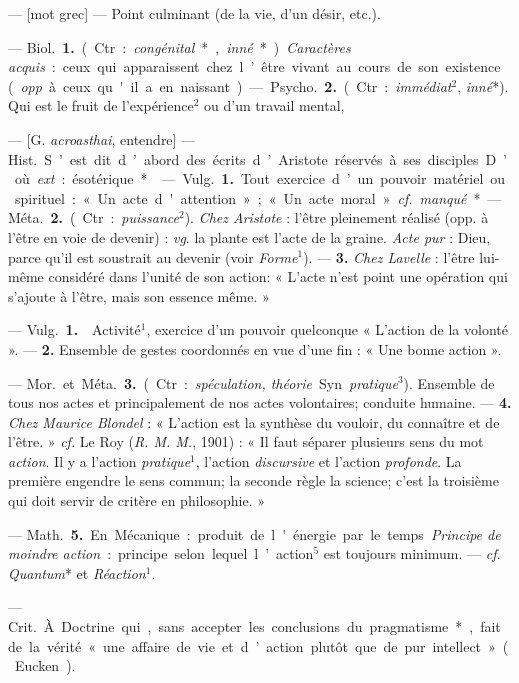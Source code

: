 \begin{itemize}[leftmargin=1cm, label=, itemsep=1pt]
 — [mot grec] — Point culminant
(de la vie, d’un désir, etc.).

 — \si{Biol.} {\bf 1.} (Ctr. : {\it congénital}*,
{\it inné}*). {\it Caractères acquis} : ceux qui
apparaissent chez l’être vivant au
cours de son existence ({\it opp}. à ceux
qu'il a en naissant).

— \si{Psycho.} {\bf 2.} (Ctr. : {\it immédiat}$^2$,
{\it inné}*). Qui est le fruit de l’expérience$^2$ ou d’un travail mental,

 — [G. {\it acroasthai}, entendre] — \si{Hist.} S’est dit d’abord des
écrits d’Aristote réservés à ses disciples. D’où {\it ext}. : ésotérique*.

 — \si{Vulg.} {\bf 1.} Tout exercice d’un
pouvoir matériel ou spirituel : « Un
acte d'attention »; « Un acte moral ».
{\it cf.}  {\it manqué}*.

— \si{Méta.} {\bf 2.} (Ctr.: {\it puissance}$^2$). {\it Chez
Aristote} : l'être pleinement réalisé
(opp. à l'être en voie de devenir) :
{\it vg}. la plante est l'acte de la graine.
{\it Acte pur} : Dieu, parce qu’il est soustrait au devenir (voir {\it Forme}$^1$). —
 {\bf 3.} {\it Chez Lavelle} : l'être lui-même
considéré dans l’unité de son action:
« L'acte n’est point une opération
qui s'ajoute à l'être, mais son
essence même. »

 — \si{Vulg.} {\bf 1.}  Activité$^1$, exercice d’un pouvoir quelconque
« L'action de la volonté ». — {\bf 2.} 
Ensemble de gestes coordonnés
en vue d'une fin : « Une bonne
action ».

— \si{Mor.} et \si{Méta.} {\bf 3.} (Ctr. : {\it spéculation, théorie}. Syn. {\it pratique}$^3$).
Ensemble de tous nos actes et principalement de nos actes volontaires;
conduite humaine. — {\bf 4.} {\it Chez Maurice Blondel} : « L'action est la
synthèse du vouloir, du connaître et de
l'être. » {\it cf.}  Le Roy ({\it R. M. M.}, 1901) :
« Il faut séparer plusieurs sens du
mot {\it action}. Il y a l’action {\it pratique}$^1$,
l’action {\it discursive} et l'action {\it profonde}. La première engendre le sens
commun; la seconde règle la science;
c’est la troisième qui doit servir de
critère en philosophie. »

— \si{Math.} {\bf 5.} En Mécanique : produit de l'énergie par le temps.
{\it Principe de moindre action} : principe
selon lequel l’action$^5$ est toujours
minimum. — {\it cf.}  {\it Quantum}* et
{\it Réaction}$^1$.

 — \si{Crit.} À Doctrine qui, 
sans accepter les conclusions du
pragmatisme*, fait de la vérité
« une affaire de vie et d’action plutôt
que de pur intellect » (Eucken).


\end{itemize}
